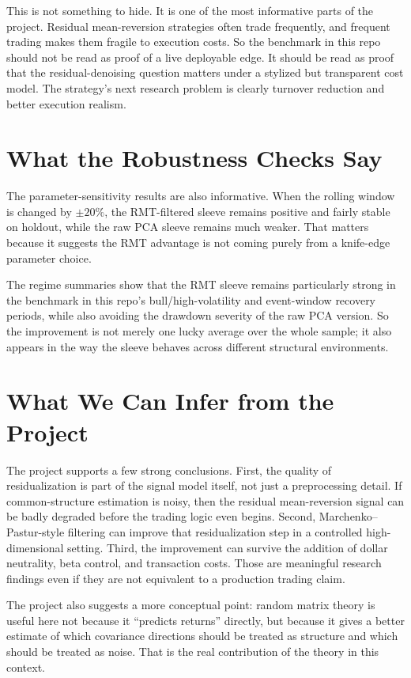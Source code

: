 \documentclass[11pt]{article}
\begin{document}
This is not something to hide. It is one of the most informative parts of the
project. Residual mean-reversion strategies often trade frequently, and frequent
trading makes them fragile to execution costs. So the benchmark in this repo should
not be read as proof of a live deployable edge. It should be read as proof that
the residual-denoising question matters under a stylized but transparent cost
model. The strategy's next research problem is clearly turnover reduction and
better execution realism.

\section*{What the Robustness Checks Say}

The parameter-sensitivity results are also informative. When the rolling window
is changed by \(\pm 20\%\), the RMT-filtered sleeve remains positive and fairly
stable on holdout, while the raw PCA sleeve remains much weaker. That matters
because it suggests the RMT advantage is not coming purely from a knife-edge
parameter choice.

The regime summaries show that the RMT sleeve remains particularly strong in the
benchmark in this repo's bull/high-volatility and event-window recovery periods, while
also avoiding the drawdown severity of the raw PCA version. So the improvement
is not merely one lucky average over the whole sample; it also appears in the
way the sleeve behaves across different structural environments.

\section*{What We Can Infer from the Project}

The project supports a few strong conclusions. First, the quality of
residualization is part of the signal model itself, not just a preprocessing
detail. If common-structure estimation is noisy, then the residual mean-reversion
signal can be badly degraded before the trading logic even begins. Second,
Marchenko--Pastur-style filtering can improve that residualization step in a
controlled high-dimensional setting. Third, the improvement can survive the
addition of dollar neutrality, beta control, and transaction costs. Those are
meaningful research findings even if they are not equivalent to a production
trading claim.

The project also suggests a more conceptual point: random matrix theory is
useful here not because it ``predicts returns'' directly, but because it gives a
better estimate of which covariance directions should be treated as structure and
which should be treated as noise. That is the real contribution of the theory in
this context.
\end{document}
